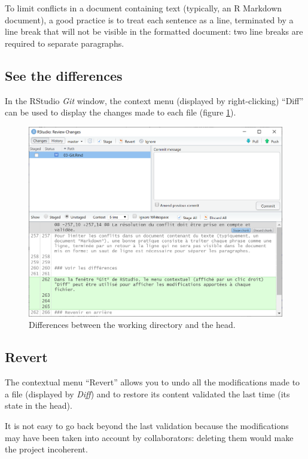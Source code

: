 \documentclass[
  12pt,
  american,
  a4paper,
  extrafontsizes,onecolumn,openright
  ]{memoir}
\begin{document}
To limit conflicts in a document containing text (typically, an R Markdown document), a good practice is to treat each sentence as a line, terminated by a line break that will not be visible in the formatted document: two line breaks are required to separate paragraphs.

\subsection{See the differences}\label{see-the-differences}

In the RStudio \emph{Git} window, the context menu (displayed by right-clicking) \enquote{Diff} can be used to display the changes made to each file (figure \ref{fig:git-diff}).



\scriptsize

\begin{figure}

{\centering \includegraphics[width=0.8\linewidth]{images/git-diff} 

}

\caption{Differences between the working directory and the head.}\label{fig:git-diff}
\end{figure}

\normalsize

\subsection{Revert}\label{revert}

The contextual menu \enquote{Revert} allows you to undo all the modifications made to a file (displayed by \emph{Diff}) and to restore its content validated the last time (its state in the head).

It is not easy to go back beyond the last validation because the modifications may have been taken into account by collaborators: deleting them would make the project incoherent.
\end{document}
